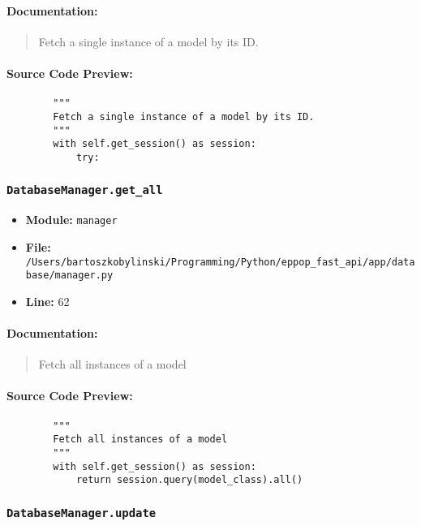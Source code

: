 \documentclass[11pt,a4paper]{article}
\begin{document}
\paragraph{Documentation:}
\begin{quote}
Fetch a single instance of a model by its ID.
\end{quote}

\paragraph{Source Code Preview:}
\begin{verbatim}
        """
        Fetch a single instance of a model by its ID.
        """
        with self.get_session() as session:
            try:
\end{verbatim}

\vspace{1em}
\subsubsection{\texttt{DatabaseManager.get\_all}}

\begin{itemize}
    \item \textbf{Module:} \texttt{manager}
    \item \textbf{File:} \texttt{/Users/bartoszkobylinski/Programming/Python/eppop\_fast\_api/app/database/manager.py}
    \item \textbf{Line:} 62
\end{itemize}

\paragraph{Documentation:}
\begin{quote}
Fetch all instances of a model
\end{quote}

\paragraph{Source Code Preview:}
\begin{verbatim}
        """
        Fetch all instances of a model
        """
        with self.get_session() as session:
            return session.query(model_class).all()
\end{verbatim}

\vspace{1em}
\subsubsection{\texttt{DatabaseManager.update}}
\end{document}
